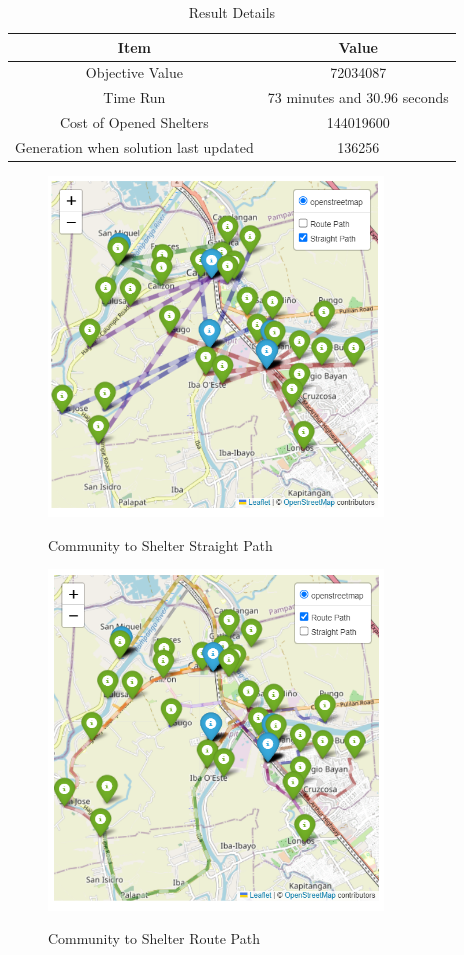 	\begin{table}[h]
		\centering
		\caption{Result Details}
		\label{resdetails}
		\begin{tabular}{|c|c|}
			\hline
			\textbf{Item} & \textbf{Value} \\ \hline
			Objective Value & 72034087 \\ 
			Time Run  & 73 minutes and 30.96 seconds \\ 
			Cost of Opened Shelters & 144019600 \\ 
			Generation when solution last updated & 136256 \\ \hline
		\end{tabular}
	\end{table}
	
	\begin{figure}[h!]
		\caption{Community to Shelter Straight Path}
		\centering
		\includegraphics[width=3.5in]{Chapter 4/straight path}
		\label{straightpath}
	\end{figure}
	
	\begin{figure}[h!]
		\caption{Community to Shelter Route Path}
		\centering
		\includegraphics[width=3.5in]{Chapter 4/route path}
		\label{routepath}
	\end{figure}
	

